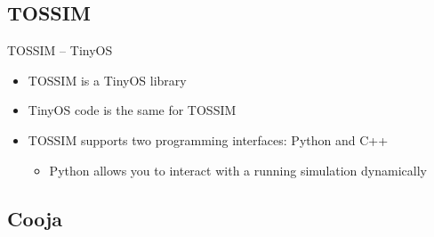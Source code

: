 \documentclass{beamer}
\begin{document}
\subsection{TOSSIM}

\begin{frame}

\begin{block}{TOSSIM -- TinyOS}

	\begin{itemize}
		\item TOSSIM is a TinyOS library
		\item TinyOS code is the same for TOSSIM
		\item TOSSIM supports two programming interfaces: Python and C++
			\begin{itemize}
				\item Python allows you to interact with a running simulation dynamically
			\end{itemize}
	\end{itemize}

\end{block}
\end{frame}
\subsection{Cooja}
\end{document}
